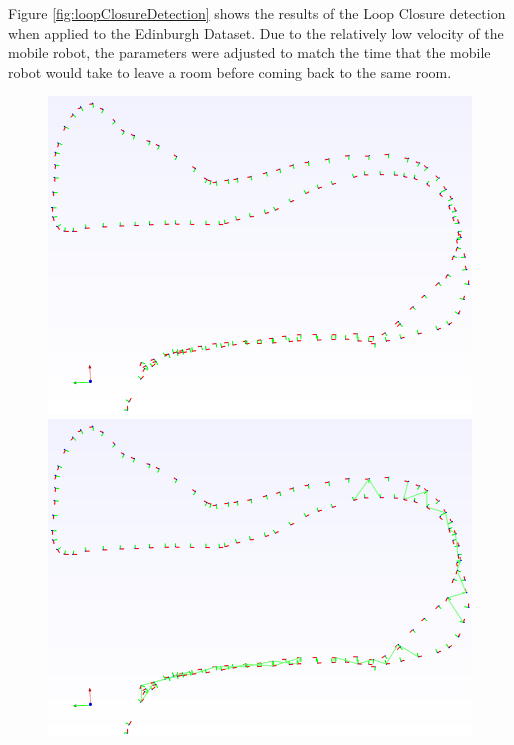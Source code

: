 \documentclass[11pt]{article}
\begin{document}
Figure \ref{fig:loopClosureDetection} shows the results of the Loop Closure detection when applied to the Edinburgh Dataset. Due to the relatively low velocity of the mobile robot, the parameters were adjusted to match the time that the mobile robot would take to leave a room before coming back to the same room.

\begin{figure}
\begin{minipage}{0.67\textwidth}
\centering
\includegraphics[width=\textwidth]{LoopClosureTimeSampling}
\includegraphics[width=\textwidth]{LoopClosureEuclideanSampling}

\end{minipage}
\end{figure}
\end{document}
